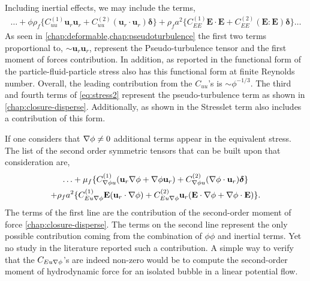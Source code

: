 Including inertial effects, we may include the terms, 
\begin{multline}
    \ldots
    +\phi \rho_f \{ C_{uu}^{(1)}
    \textbf{u}_{r}\textbf{u}_{r} 
    + C_{uu}^{(2)} (\textbf{u}_{r}\cdot \textbf{u}_{r}) \bm\delta \}
    + 
    \rho_f a^2 \{ C_{EE}^{(1)} \textbf{E}\cdot \textbf{E}
    +  C_{EE}^{(2)} (\textbf{E} : \textbf{E})\bm\delta \}
    \ldots
    \label{eq:stress2}
\end{multline}
As seen in \ref{chap:deformable,chap:pseudoturbulence} the first two terms proportional to, $\sim \textbf{u}_{r}\textbf{u}_{r}$, represent the Pseudo-turbulence tensor and the first moment of forces contribution. 
In addition, as reported in \citet{zhang2021stress} the functional form of the particle-fluid-particle stress also has this functional form at finite Reynolds number. 
Overall, the leading contribution from the $C_{uu}$'s is $\sim \phi^{-1/3}$. 
The third and fourth terms of \ref{eq:stress2} represent the pseudo-turbulence term as shown in \ref{chap:closure-disperse}. 
Additionally, as shown in \citet{stone2001inertial} the Stresslet term also includes a contribution of this form. 

If one considers that $\mathbf{\nabla} \phi \neq 0$ additional terms appear in the equivalent stress.  
The list of the second order symmetric tensors that can be built upon that consideration are, 
\begin{multline}
    \ldots 
    +  \mu_f \{
    C_{\grad \phi u}^{(1)}
    (\textbf{u}_{r}
    \grad \phi 
    + 
    \grad \phi 
    \textbf{u}_{r}) 
    +C_{\grad \phi u}^{(2)} (\grad \phi \cdot 
    \textbf{u}_{r})\bm\delta \}\\
    +\rho_f a^2 \{
    C_{Eu \grad \phi}^{(1)} \textbf{E} (\textbf{u}_r\cdot \grad \phi) 
    + C_{Eu \grad \phi}^{(2)}  \textbf{u}_r (\textbf{E}\cdot\grad \phi+ \grad \phi\cdot \textbf{E})
    \}.
    \label{eq:stress_inho}
\end{multline}
The terms of the first line are the contribution of the second-order moment of force \eqref{chap:closure-disperse}. 
The terms on the second line represent the only possible contribution coming from the combination of $\phi\phi$ and inertial terms. 
Yet no study in the literature reported such a contribution.
A simple way to verify that the $C_{Eu \mathbf{\nabla} \phi}$'s are indeed non-zero would be to compute the second-order moment of hydrodynamic force for an isolated bubble in a linear potential flow. 

